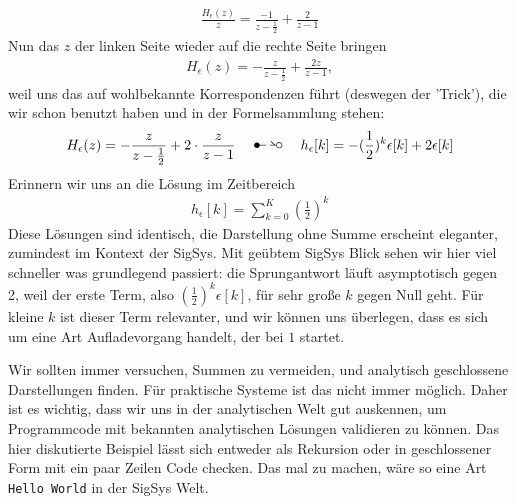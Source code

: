 \begin{ExCalc}
\begin{align}
\frac{H_\epsilon(z)}{z} = \frac{-1}{z-\frac{1}{2}} + \frac{2}{z-1}
\end{align}
Nun das $z$ der linken Seite wieder auf die rechte Seite bringen
\begin{align}
H_\epsilon(z) = -\frac{z}{z-\frac{1}{2}} + \frac{2 z}{z-1},
\end{align}
weil uns das auf wohlbekannte Korrespondenzen führt (deswegen der 'Trick'),
die wir schon benutzt haben und in der Formelsammlung stehen:
\begin{align}
H_\epsilon(z) = -\frac{z}{z-\frac{1}{2}} + 2\cdot\frac{z}{z-1}
\quad\Ztransf\quad
h_\epsilon[k] = - (\frac{1}{2})^k \epsilon[k] + 2 \epsilon[k]
\end{align}
Erinnern wir uns an die Lösung im Zeitbereich
\begin{align}
h_\epsilon[k] = \sum_{k=0}^K (\frac{1}{2})^k
\end{align}
Diese Lösungen sind identisch, die Darstellung ohne Summe erscheint
eleganter, zumindest im Kontext der SigSys. Mit geübtem SigSys Blick
sehen wir hier viel schneller was grundlegend passiert: die Sprungantwort
läuft asymptotisch gegen 2, weil der erste Term, also
$(\frac{1}{2})^k \epsilon[k]$, für sehr große $k$ gegen Null geht.
Für kleine $k$ ist dieser Term relevanter, und wir können uns überlegen, dass
es sich um eine Art Aufladevorgang handelt, der bei $1$ startet.

Wir sollten immer versuchen, Summen zu vermeiden, und analytisch geschlossene
Darstellungen finden. Für praktische Systeme ist das nicht immer möglich.
Daher ist es wichtig, dass wir uns in der analytischen Welt gut auskennen, um
Programmcode mit bekannten analytischen Lösungen validieren zu können.
%
Das hier diskutierte Beispiel lässt sich entweder als Rekursion oder in geschlossener
Form mit ein paar Zeilen Code checken. Das mal zu machen, wäre so eine Art
\texttt{Hello World} in der SigSys Welt.
\end{ExCalc}
